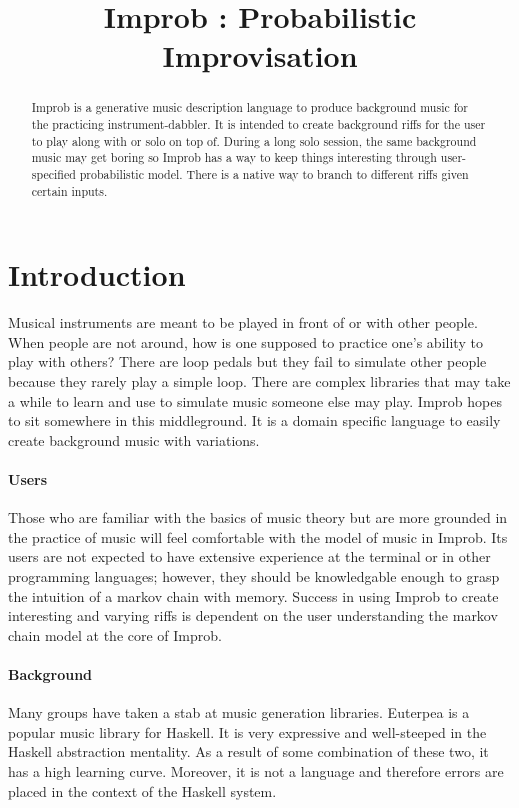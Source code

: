 \documentclass{sigplanconf-pldi15}
\begin{document}
%
%

\title{Improb : Probabilistic Improvisation}

\maketitle
\begin{abstract}
Improb is a generative music description language to produce background music for the practicing instrument-dabbler. It is intended to create background riffs for the user to play along with or solo on top of. During a long solo session, the same background music may get boring so Improb has a way to keep things interesting through user-specified probabilistic model. There is a native way to branch to different riffs given certain inputs.
\end{abstract}

\section{Introduction}
Musical instruments are meant to be played in front of or with other people. When people are not around, how is one supposed to practice one's ability to play with others? There are loop pedals but they fail to simulate other people because they rarely play a simple loop. There are complex libraries that may take a while to learn and use to simulate music someone else may play. Improb hopes to sit somewhere in this middleground. It is a domain specific language to easily create background music with variations.

\paragraph{Users}
Those who are familiar with the basics of music theory but are more grounded in the practice of music will feel comfortable with the model of music in Improb. Its users are not expected to have extensive experience at the terminal or in other programming languages; however, they should be knowledgable enough to grasp the intuition of a markov chain with memory. Success in using Improb to create interesting and varying riffs is dependent on the user understanding the markov chain model at the core of Improb.

\paragraph{Background}
Many groups have taken a stab at music generation libraries. Euterpea is a popular music library for Haskell. It is very expressive and well-steeped in the Haskell abstraction mentality. As a result of some combination of these two, it has a high learning curve. Moreover, it is not a language and therefore errors are placed in the context of the Haskell system.
\end{document}
